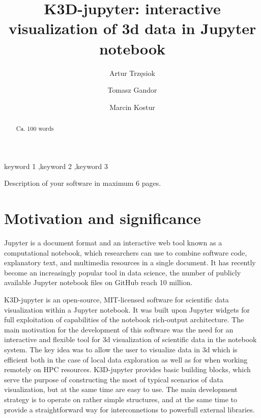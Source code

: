 \documentclass[preprint,12pt, a4paper]{elsarticle}
\begin{document}
\begin{frontmatter}

\title{K3D-jupyter: interactive visualization of 3d data in Jupyter notebook}


\author[cube]{Artur Trzęsiok}
\author[fp]{Tomasz Gandor}
\author[sil]{Marcin Kostur}

\address[cube]{Cubeproject}
\address[sil]{Institute of Physics, University of Silesia, 41-500 Chorzów, Poland}
\address[fp]{Future Processing, 44-100 Gliwice, Poland}
\begin{abstract}
Ca. 100 words

\end{abstract}

\begin{keyword}
keyword 1 \sep keyword 2 \sep keyword 3



\end{keyword}

\end{frontmatter}

\linenumbers


Description of your software in maximum 6 pages.

\section{Motivation and significance}
\label{}

Jupyter is a document format and an interactive web tool known as a
computational notebook, which researchers can use to combine software
code, explanatory text, and multimedia resources in a single document.
It has recently become an increasingly popular tool in data
science\cite{perkel_why_2018}, the number of publicly available
Jupyter notebook files on GitHub reach 10 million.

K3D-jupyter is an open-source, MIT-licensed software for scientific
data visualization within a Jupyter notebook. It was built upon
Jupyter widgets for full exploitation of capabilities of the notebook
rich-output architecture.  The main motivation for the development of
this software was the need for an interactive and flexible tool for 3d
visualization of scientific data in the notebook system. The key idea was
to allow the user to visualize data in 3d which is efficient both in
the case of local data exploration as well as for when working
remotely on HPC resources. K3D-jupyter provides basic building blocks,
which serve the purpose of constructing the most of typical
scenarios of data visualization, but at the same time are easy to
use. The main development strategy is to operate on rather simple
structures, and at the same time to provide a straightforward way for
interconnetions to powerfull external libraries.
\end{document}
